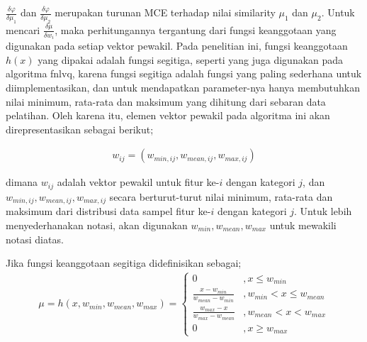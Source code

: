 $\frac{\delta \varphi}{\delta \mu_1}$ dan $\frac{\delta \varphi}{\delta
\mu_2}$ merupakan turunan MCE terhadap nilai similarity $\mu_1$ dan $\mu_2$.
Untuk mencari $\frac{\delta \mu}{\delta w_i}$, maka perhitungannya tergantung
dari fungsi keanggotaan yang digunakan pada setiap vektor pewakil. Pada
penelitian ini, fungsi keanggotaan $h(x)$ yang dipakai adalah fungsi segitiga,
seperti yang juga digunakan pada algoritma \gls{fnlvq}, karena fungsi segitiga adalah
fungsi yang paling sederhana untuk diimplementasikan, dan untuk mendapatkan
parameter-nya hanya membutuhkan nilai minimum, rata-rata dan maksimum yang
dihitung dari sebaran data pelatihan. Oleh karena itu, elemen vektor pewakil
pada algoritma ini akan direpresentasikan sebagai berikut;

\begin{align}
\label{eq:trimbobot}
	w_{ij} = (w_{min,ij}, w_{mean,ij}, w_{max,ij})
\end{align}

\noindent dimana $w_{ij}$ adalah vektor pewakil untuk fitur ke-$i$ dengan
kategori $j$, dan $w_{min,ij}, w_{mean,ij}, w_{max,ij}$ secara
berturut-turut nilai minimum, rata-rata dan maksimum dari distribusi data sampel
fitur ke-$i$ dengan kategori $j$. Untuk lebih menyederhanakan notasi, akan
digunakan $w_{min}, w_{mean}, w_{max}$ untuk mewakili notasi diatas.

\noindent Jika fungsi keanggotaan segitiga didefinisikan sebagai;
\begin{align}
\label{eq:trim}
	\mu = h(x, w_{min}, w_{mean}, w_{max}) = \left\{ 
	\begin{array}{ll}
	0 & , x \leq w_{min}\\
	\frac{x - w_{min}}{w_{mean} - w_{min}} & , w_{min} < x \leq w_{mean} \\
	\frac{w_{max} - x}{w_{max} - w_{mean}} & , w_{mean} < x < w_{max} \\
	0 & , x \geq w_{max}
	\end{array}
\end{align}

